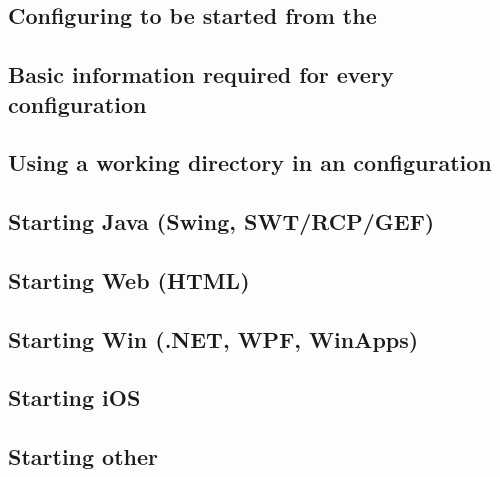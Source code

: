 \subsection{Configuring \gdauts{} to be started from the \ite{}}
\label{configuringaut}


\subsection{Basic information required for every \gdaut{} configuration}
\label{TasksBasicConfigurationInfo}


\subsection{Using a working directory in an \gdaut{} configuration}
\label{TasksWorkingDir}


\subsection{Starting Java \gdauts{} (Swing, SWT/RCP/GEF)}
\label{TasksStartJavaAUT}


\subsection{Starting Web \gdauts{} (HTML)}
\label{TasksStartWebAUT}


\subsection{Starting Win \gdauts{} (.NET, WPF, WinApps)}
\label{TasksStartWinAUT}
 

\subsection{Starting iOS \gdauts{}}
\label{TasksStartiOSAUT}


\subsection{Starting other \gdauts{}}




